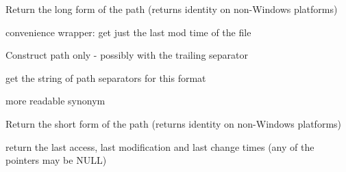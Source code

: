 \label{wxfilenamegetlongpath}


Return the long form of the path (returns identity on non-Windows platforms)


\label{wxfilenamegetmodificationtime}


convenience wrapper: get just the last mod time of the file


\label{wxfilenamegetname}



\label{wxfilenamegetpath}


Construct path only - possibly with the trailing separator


\label{wxfilenamegetpathseparators}


get the string of path separators for this format


\label{wxfilenamegetpathwithsep}


more readable synonym


\label{wxfilenamegetshortpath}


Return the short form of the path (returns identity on non-Windows platforms)


\label{wxfilenamegettimes}


return the last access, last modification and last change times
(any of the pointers may be NULL)


\label{wxfilenamegetvolume}

